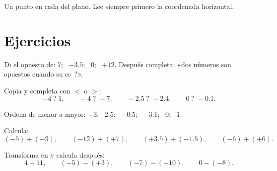 \begin{omfigure}

{\small Un punto en cada  del plano. Lee siempre primero la
coordenada horizontal.}
\end{omfigure}

\section{Ejercicios}

\begin{exercise}[$\star$]\label{exo:g7:negatives:1}
Di el opuesto de: $7$; \ $-3.5$; \ $0$; \ $+12$. Después completa:
«dos números son opuestos cuando su  es~?».
\end{exercise}

\begin{exercise}[$\star$]\label{exo:g7:negatives:2}
Copia y completa con $<$ o $>$:
\[
-4 \;?\; 1, \qquad
-4 \;?\; -7, \qquad
-2.5 \;?\; -2.4, \qquad
0 \;?\; -0.1 .
\]
\end{exercise}

\begin{exercise}[$\star$]\label{exo:g7:negatives:3}
Ordena de menor a mayor: $-3$; \ $2.5$; \ $-0.5$; \ $-3.1$;
\ $0$; \ $1$.
\end{exercise}

\begin{exercise}[$\star$]\label{exo:g7:negatives:4}
Calcula:
\[
(-5) + (-9), \qquad
(-12) + (+7), \qquad
(+3.5) + (-1.5), \qquad
(-6) + (+6).
\]
\end{exercise}

\begin{exercise}[$\star$]\label{exo:g7:negatives:5}
Transforma en  y calcula después:
\[
4 - 11, \qquad
(-5) - (+3), \qquad
(-7) - (-10), \qquad
0 - (-8).
\]
\end{exercise}

